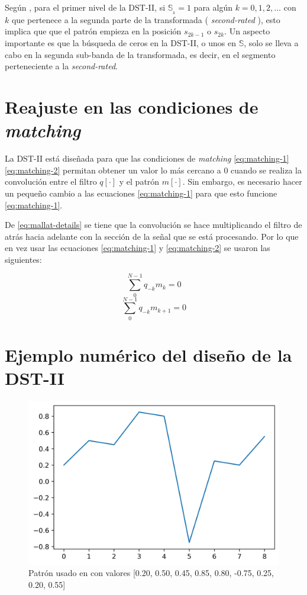 Según \cite{Guido2018}, para el primer nivel de la DST-II, si $\mathbb{S}_{_k}=1$ para algún $k=0,1,2,\ldots$
con $k$ que pertenece a la segunda parte de la transformada ( \textit{second-rated} ), esto implica que 
que el patrón empieza en la posición $s_{2k-1}$ o $s_{2k}$. Un aspecto importante es que la búsqueda de 
ceros en la DST-II, o unos en $\mathbb{S}$, solo se lleva a cabo en la segunda sub-banda de la transformada,
es decir, en el segmento perteneciente a la \textit{second-rated}.

\section{Reajuste en las condiciones de \textit{matching}}

La DST-II está diseñada para que las condiciones de \textit{matching} \ref{eq:matching-1} \ref{eq:matching-2} 
permitan obtener un valor lo más cercano a $0$ cuando se realiza la convolución entre el filtro $q[\cdot]$
y el patrón $m[\cdot]$. Sin embargo, es necesario hacer un pequeño cambio a las ecuaciones \ref{eq:matching-1}
para que esto funcione \ref{eq:matching-1}.

De \ref{eq:mallat-details} se tiene que la convolución se hace multiplicando el filtro de atrás hacia adelante 
con la sección de la señal que se está procesando. Por lo que en vez usar las ecuaciones \ref{eq:matching-1}
y \ref{eq:matching-2} se usaron las siguientes:

\begin{equation}\label{eq:matching-1}
	\sum_{0}^{N-1} q_{-k}m_{k} = 0
\end{equation}
\begin{equation}\label{eq:matching-2}
	\sum_{0}^{N-1} q_{-k}m_{k+1} = 0
\end{equation}

\section{Ejemplo numérico del diseño de la DST-II}

\begin{figure} 
	\centering
	\includegraphics[scale=0.8]{Graphics/guido20118-pattern.png}
	\caption{Patrón usado en \cite{Guido2018} con valores [0.20, 0.50, 0.45, 0.85, 0.80, -0.75, 0.25, 0.20, 0.55]}\label{fig:Guido2018-pattern}
\end{figure}

